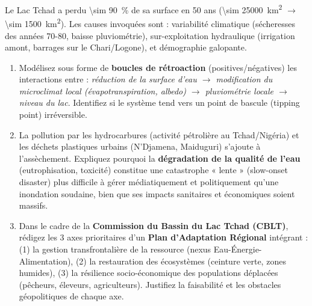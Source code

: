 \documentclass[11pt]{article}
\begin{document}
\begin{exercice}
    Le Lac Tchad a perdu \SI{\sim 90}{\%} de sa surface en 50 ans (\SI{\sim 25000}{km^2} $\to$ \SI{\sim 1500}{km^2}). Les causes invoquées sont : variabilité climatique (sécheresses des années 70-80, baisse pluviométrie), sur-exploitation hydraulique (irrigation amont, barrages sur le Chari/Logone), et démographie galopante.
    \begin{enumerate}
        \item Modélisez sous forme de \textbf{boucles de rétroaction} (positives/négatives) les interactions entre : \textit{réduction de la surface d'eau $\to$ modification du microclimat local (évapotranspiration, albedo) $\to$ pluviométrie locale $\to$ niveau du lac}. Identifiez si le système tend vers un point de bascule (tipping point) irréversible.
        \item La pollution par les hydrocarbures (activité pétrolière au Tchad/Nigéria) et les déchets plastiques urbains (N'Djamena, Maiduguri) s'ajoute à l'assèchement. Expliquez pourquoi la \textbf{dégradation de la qualité de l'eau} (eutrophisation, toxicité) constitue une catastrophe « lente » (slow-onset disaster) plus difficile à gérer médiatiquement et politiquement qu'une inondation soudaine, bien que ses impacts sanitaires et économiques soient massifs.
        \item Dans le cadre de la \textbf{Commission du Bassin du Lac Tchad (CBLT)}, rédigez les 3 axes prioritaires d'un \textbf{Plan d'Adaptation Régional} intégrant : (1) la gestion transfrontalière de la ressource (nexus Eau-Énergie-Alimentation), (2) la restauration des écosystèmes (ceinture verte, zones humides), (3) la résilience socio-économique des populations déplacées (pêcheurs, éleveurs, agriculteurs). Justifiez la faisabilité et les obstacles géopolitiques de chaque axe.
    \end{enumerate}
\end{exercice}
\end{document}

